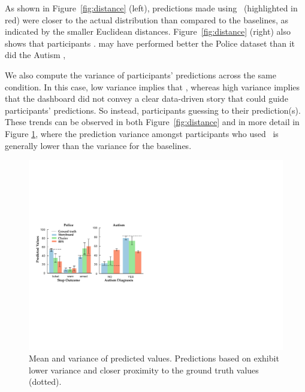 As shown in Figure~\ref{fig:distance} (left), 
predictions made using \system\ (highlighted in red) 
were closer to the actual distribution than compared to the baselines, 
as indicated by the smaller Euclidean distances. 
Figure~\ref{fig:distance} (right) also shows 
that \system participants . 
\cluster may have performed better  
the Police dataset than it did  
the Autism ,


\par We also compute the variance of participants' predictions across the same condition. In this case, low variance implies 
that 
, 
whereas high variance implies that the 
dashboard did not convey a clear data-driven story 
that could guide participants' predictions. 
So instead, participants  guessing to 
 their prediction(s). These trends can be observed in both Figure~\ref{fig:distance} and in more detail in Figure \ref{fig:actual_predictions}, where the prediction variance amongst participants who used \system\ is generally lower than the variance for the baselines. 
\begin{figure}[h!]
\vspace{-10pt}
\centering
\includegraphics[width=0.85\linewidth]{figures/prediction.pdf}
\vspace{-10pt}
\caption{Mean and variance of predicted values. Predictions based on \system exhibit lower variance  and closer proximity to the ground truth values (dotted).}
\label{fig:actual_predictions}
\vspace{-10pt}
\end{figure}

